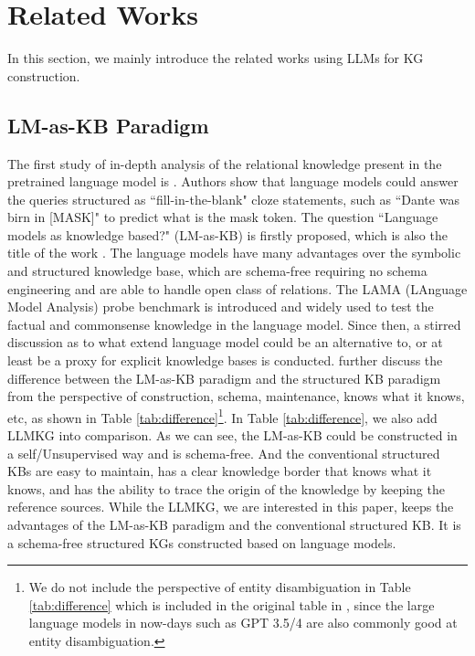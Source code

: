 \section{Related Works}
In this section, we mainly introduce the related works using LLMs for KG construction. 





\subsection{LM-as-KB Paradigm}
The first study of in-depth analysis of the relational knowledge present in the pretrained language model is \cite{llmaskb}. Authors show that language models could answer the queries structured as ``fill-in-the-blank" cloze statements, such as ``Dante was birn in [MASK]" to predict what is the mask token. The question ``Language models as knowledge based?" (LM-as-KB) is firstly proposed, which is also the title of the work \cite{llmaskb}. The language models have many advantages over the symbolic and structured knowledge base, which are schema-free requiring no schema engineering and are able to handle open class of relations.  The LAMA (LAnguage Model Analysis) probe benchmark is introduced and widely used to test the factual and commonsense knowledge in the language model. Since then, a stirred discussion as to what extend language model could be an alternative to, or at least be a proxy for explicit knowledge bases is conducted. \cite{llmaskborforkb} further discuss the difference between the LM-as-KB paradigm and the structured KB paradigm from the perspective of construction, schema, maintenance, knows what it knows, etc, as shown in Table \ref{tab:difference}\footnote{We do not include the  perspective of entity disambiguation in Table \ref{tab:difference} which is included in the original table in \cite{llmaskborforkb}, since the large language models in now-days such as GPT 3.5/4 are also commonly good at entity disambiguation. }. In Table \ref{tab:difference}, we also add LLMKG into comparison. As we can see, the LM-as-KB could be constructed in a self/Unsupervised way and is schema-free. And the conventional structured KBs are easy to maintain, has a clear knowledge border that knows what it knows, and has the ability to trace the origin of the knowledge by keeping the reference sources. While the LLMKG, we are interested in this paper, keeps the advantages of the LM-as-KB paradigm and the conventional structured KB. It is a schema-free structured KGs constructed based on language models. 

